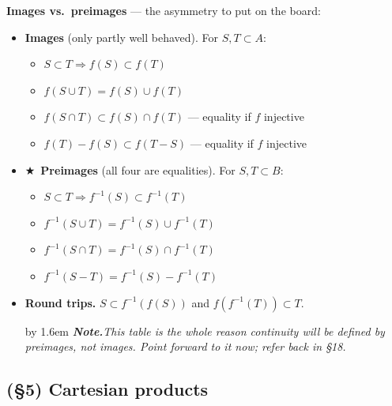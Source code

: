 \documentclass[12pt,a4paper]{article}
\newcommand{\Key}{$\bigstar$~}                  %
\newcommand{\Cue}[1]{%
  \par\addvspace{7pt}\nopagebreak
  \begingroup
    \advance\leftskip by 1.6em
    \parindent=0pt \small\color{cue}%
    \textbf{\textit{Note.}}\enspace \textit{#1}\par
  \endgroup
  \addvspace{9pt}}
\newenvironment{BL}%
  {\begin{itemize}[leftmargin=1.4em,labelsep=0.55em,itemsep=11pt,topsep=11pt,parsep=0pt]}%
  {\end{itemize}}
\newenvironment{SB}%
  {\begin{itemize}[label=--,leftmargin=1.3em,labelsep=0.45em,itemsep=6pt,topsep=7pt,parsep=0pt]}%
  {\end{itemize}}
\newcommand{\imp}{\Rightarrow}
\begin{document}
\textbf{Images vs.\ preimages} --- the asymmetry to put on the board:

\begin{BL}
\item \textbf{Images} (only partly well behaved). For $S,T\subset A$:
  \begin{SB}
  \item $S\subset T\imp f(S)\subset f(T)$
  \item $f(S\cup T)=f(S)\cup f(T)$
  \item $f(S\cap T)\subset f(S)\cap f(T)$ \quad --- equality if $f$ injective
  \item $f(T)-f(S)\subset f(T-S)$ \quad --- equality if $f$ injective
  \end{SB}
\item \Key\textbf{Preimages} (all four are equalities). For $S,T\subset B$:
  \begin{SB}
  \item $S\subset T\imp f^{-1}(S)\subset f^{-1}(T)$
  \item $f^{-1}(S\cup T)=f^{-1}(S)\cup f^{-1}(T)$
  \item $f^{-1}(S\cap T)=f^{-1}(S)\cap f^{-1}(T)$
  \item $f^{-1}(S-T)=f^{-1}(S)-f^{-1}(T)$
  \end{SB}
\item \textbf{Round trips.} $S\subset f^{-1}(f(S))$ and $f(f^{-1}(T))\subset T$.
\Cue{This table is the whole reason continuity will be defined by preimages, not images.
Point forward to it now; refer back in \S18.}
\end{BL}

\subsection{(\S5) Cartesian products}
\end{document}
